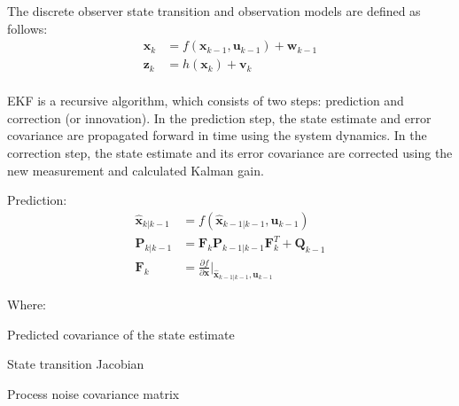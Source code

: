 The discrete observer state transition and observation models are defined as follows:
\begin{equation}
	\begin{aligned}
		\boldsymbol{x}_{k} & = f(\boldsymbol{x}_{k-1}, \boldsymbol{u}_{k-1}) + \boldsymbol{w}_{k-1} \\
		\boldsymbol{z}_{k} & = h(\boldsymbol{x}_{k}) + \boldsymbol{v}_{k}                           \\
	\end{aligned}
\end{equation}

EKF is a recursive algorithm, which consists of two steps: prediction and correction (or innovation). In the prediction step, the state estimate and error covariance are propagated forward in time using the system dynamics. In the correction step, the state estimate and its error covariance are corrected using the new measurement and calculated Kalman gain.

Prediction:
\begin{equation}
	\begin{aligned}
		\hat{\boldsymbol{x}}_{k|k-1} & = f(\hat{\boldsymbol{x}}_{k-1|k-1}, \boldsymbol{u}_{k-1})                                            \\
		\boldsymbol{P}_{k|k-1}       & = \boldsymbol{F}_k \boldsymbol{P}_{k-1|k-1} \boldsymbol{F}_k^T + \boldsymbol{Q}_{k -1}               \\
		\boldsymbol{F}_k             & = \frac{\partial f}{\partial \boldsymbol{x}}|_{\hat{\boldsymbol{x}}_{k-1|k-1}, \boldsymbol{u}_{k-1}}
	\end{aligned}
\end{equation}

Where:
\begin{eqwhere}[3cm]
	\item[$\boldsymbol{P}_{k|k-1}  $] Predicted covariance of the state estimate
	\item[$\boldsymbol{F}_k$] State transition Jacobian
	\item[$\boldsymbol{Q}_{k-1}$] Process noise covariance matrix
\end{eqwhere}

